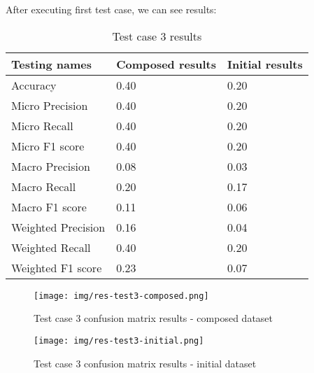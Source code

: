 After executing first test case, we can see results:
\begin{table}[!ht]
  \centering
    \begin{tabular}{ |m{14em}|m{9em}|m{9em}| } 
     \hline
        Testing names & Composed results & Initial results \\ 
     \hline
        Accuracy & 0.40 & 0.20 \\
     \hline
        Micro Precision & 0.40 & 0.20 \\
     \hline
        Micro Recall & 0.40 & 0.20 \\
     \hline
        Micro F1 score & 0.40 & 0.20 \\
     \hline
        Macro Precision & 0.08 & 0.03 \\
     \hline
        Macro Recall & 0.20 & 0.17 \\
     \hline
        Macro F1 score & 0.11 & 0.06 \\
     \hline
        Weighted Precision & 0.16 & 0.04 \\
     \hline
        Weighted Recall & 0.40 & 0.20 \\
     \hline
        Weighted F1 score & 0.23 & 0.07 \\
     \hline
    \end{tabular}
\caption{Test case 3 results}
\end{table}

\begin{figure}[H]
    \centerline{\texttt{[image: img/res-test3-composed.png]}}
    \caption{Test case 3 confusion matrix results - composed dataset}
\end{figure}
\begin{figure}[H]
    \centerline{\texttt{[image: img/res-test3-initial.png]}}
    \caption{Test case 3 confusion matrix results - initial dataset}
\end{figure}

